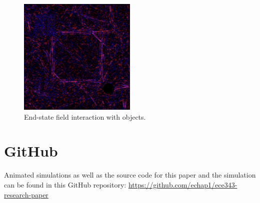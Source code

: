 \documentclass[12pt]{article}
\begin{document}
\begin{spacing}{1.5}
\begin{figure}[h!]
    \centering
    \includegraphics[width=0.5\textwidth]{images/sim3}
    \caption{End-state field interaction with objects.}
    \label{fig:sim3}
\end{figure}

\FloatBarrier

\section{GitHub}

Animated simulations as well as the source code for this paper and the simulation can be found in this GitHub repository: \url{https://github.com/echap1/ece343-research-paper}





\end{spacing}
\end{document}
